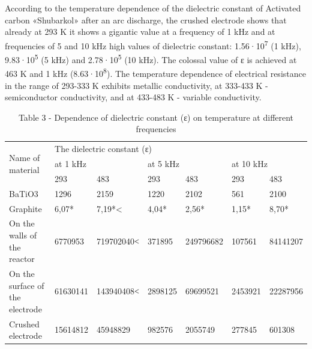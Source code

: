 \begin{multicols}{2}
According to the temperature dependence of the dielectric constant of
Activated carbon «Shubarkol» after an arc discharge, the crushed
electrode shows that already at 293 K it shows a gigantic value at a
frequency of 1 kHz and at frequencies of 5 and 10 kHz high values
\hspace{0pt}\hspace{0pt}of dielectric constant:
1.56·10\textsuperscript{7} (1 kHz), 9.83·10\textsuperscript{5} (5 kHz)
and 2.78·10\textsuperscript{5} (10 kHz). The colossal value of ε is
achieved at 463 K and 1 kHz (8.63·10\textsuperscript{8}). The
temperature dependence of electrical resistance in the range of 293-333
K exhibits metallic conductivity, at 333-433 K - semiconductor
conductivity, and at 433-483 K - variable conductivity.
\end{multicols}

\begin{table}[H]
\caption*{Table 3 - Dependence of dielectric constant (ε) on temperature at different frequencies}
\centering
\begin{tabular}{|p{}|llllll|}
\hline
\multirow{3}{=}{Name of material} & \multicolumn{6}{l|}{The 			dielectric constant (ε)} \\ \cline{2-7} 
 & \multicolumn{2}{l|}{at 			1 kHz} & \multicolumn{2}{l|}{at 			5 kHz} & \multicolumn{2}{l|}{at 			10 kHz} \\ \cline{2-7} 
 & \multicolumn{1}{l|}{293} & \multicolumn{1}{l|}{483} & \multicolumn{1}{l|}{293} & \multicolumn{1}{l|}{483} & \multicolumn{1}{l|}{293} & 483 \\ \hline
BaTiO3 & \multicolumn{1}{l|}{1296} & \multicolumn{1}{l|}{2159} & \multicolumn{1}{l|}{1220} & \multicolumn{1}{l|}{2102} & \multicolumn{1}{l|}{561} & 2100 \\ \hline
Graphite & \multicolumn{1}{l|}{6,07*} & \multicolumn{1}{l|}{7,19*\textless{}} & \multicolumn{1}{l|}{4,04*} & \multicolumn{1}{l|}{2,56*} & \multicolumn{1}{l|}{1,15*} & 8,70* \\ \hline
On 			the walls of the reactor & \multicolumn{1}{l|}{6770953} & \multicolumn{1}{l|}{719702040˂} & \multicolumn{1}{l|}{371895} & \multicolumn{1}{l|}{249796682} & \multicolumn{1}{l|}{107561} & 84141207 \\ \hline
On 			the surface of the electrode & \multicolumn{1}{l|}{61630141} & \multicolumn{1}{l|}{143940408˂} & \multicolumn{1}{l|}{2898125} & \multicolumn{1}{l|}{69699521} & \multicolumn{1}{l|}{2453921} & 22287956 \\ \hline
Crushed 			electrode & \multicolumn{1}{l|}{15614812} & \multicolumn{1}{l|}{45948829} & \multicolumn{1}{l|}{982576} & \multicolumn{1}{l|}{2055749} & \multicolumn{1}{l|}{277845} & 601308 \\ \hline
\end{tabular}
\end{table}

